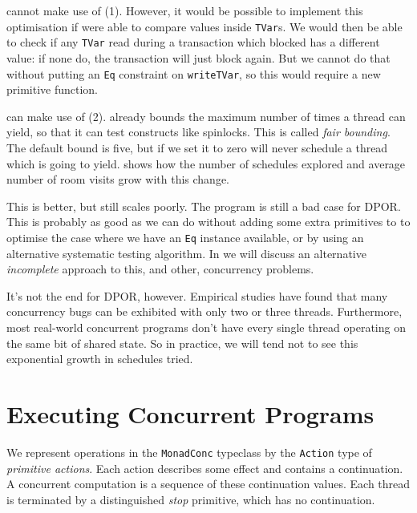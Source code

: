 \dejafu{} cannot make use of (1).  However, it would be possible to
implement this optimisation if \dejafu{} were able to compare values
inside \verb|TVar|s.  We would then be able to check if any
\verb|TVar| read during a transaction which blocked has a different
value: if none do, the transaction will just block again.  But we
cannot do that without putting an \verb|Eq| constraint on
\verb|writeTVar|, so this would require a new primitive function.

\dejafu{} can make use of (2).  \dejafu{} already bounds the maximum
number of times a thread can yield, so that it can test constructs
like spinlocks.  This is called \emph{fair bounding}.  The default
bound is five, but if we set it to zero \dejafu{} will never schedule
a thread which is going to yield.   shows how the
number of schedules explored and average number of room visits grow
with this change.

This is better, but still scales poorly.  The program is still a bad
case for DPOR.  This is probably as good as we can do without adding
some extra primitives to \dejafu{} to optimise the case where we have
an \verb|Eq| instance available, or by using an alternative systematic
testing algorithm.  In  we will discuss an
alternative \emph{incomplete} approach to this, and other, concurrency
problems.

It's not the end for DPOR, however.  Empirical
studies\cite{thomson2014} have found that many concurrency bugs can be
exhibited with only two or three threads.  Furthermore, most
real-world concurrent programs don't have every single thread
operating on the same bit of shared state.  So in practice, we will
tend not to see this exponential growth in schedules tried.

\section{Executing Concurrent Programs}
\label{sec:dejafu-execution}

We represent operations in the \verb|MonadConc| typeclass by the
\verb|Action| type of \emph{primitive actions}.  Each action describes
some effect and contains a continuation.  A concurrent computation is
a sequence of these continuation values.  Each thread is terminated by
a distinguished \emph{stop} primitive, which has no continuation.

\FloatBarrier

